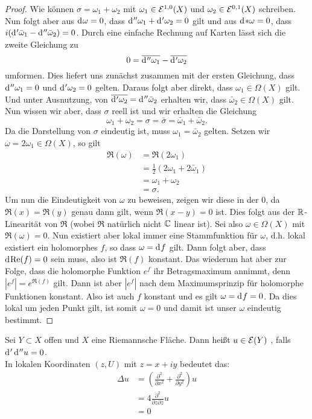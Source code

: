 \begin{proof}
  Wie können $\sigma = \omega_1 + \omega_2$ mit $\omega_1 \in
  \mathcal{E}^{1,0}(X)$ und $\omega_2 \in \mathcal{E}^{0,1}(X)$ schreiben. Nun
  folgt aber aus $\d[\omega] = 0$, dass $\d[''\omega_1] +
  \d['\omega_2] = 0$ gilt und aus $\d[\ast \omega] = 0$, dass
  $i(\d['\bar \omega_1] - \d[''\bar \omega_2]) = 0$. Durch eine einfache
  Rechnung auf Karten lässt sich die zweite Gleichung zu
  \[
  0 = \overline{\d[''\omega_1]} - \overline{\d['\omega_2]}
  \]
  umformen. Dies liefert uns zunächst zusammen mit der ersten
  Gleichung, dass $\d[''\omega_1] = 0$ und $\d['\omega_2] = 0$
  gelten. Daraus folgt aber direkt, dass $\omega_1 \in \Omega(X)$
  gilt. Und unter Ausnutzung, von $\overline{\d['\omega_2]} = \d[''
  \bar \omega_2]$ erhalten wir, dass $\bar \omega_2 \in \Omega(X)$
  gilt. Nun wissen wir aber, dass $\sigma$ reell ist und wir erhalten
  die Gleichung
  \[
  \omega_1 + \omega_2 = \sigma = \bar \sigma = \bar \omega_1 + \bar
  \omega_2.
  \]
  Da die Darstellung von $\sigma$ eindeutig ist, muss $\omega_1 =
  \bar \omega_2$ gelten. Setzen wir $\omega = 2\omega_1 \in
  \Omega(X)$, so gilt
  \begin{align*}
    \Re(\omega) & = \Re(2\omega_1) \\
    & = \frac{1}{2}( 2 \omega_1 + 2 \bar \omega_1) \\
    & = \omega_1 + \omega_2 \\
    & = \sigma.
  \end{align*}
  Um nun die Eindeutigkeit von $\omega$ zu beweisen, zeigen wir diese
  in der $0$, da $\Re(x) = \Re(y)$ genau dann gilt, wenn $\Re(x-y) =
  0$ ist. Dies folgt aus der $\mathbb{R}$-Linearität von $\Re$ (wobei $\Re$
  natürlich nicht $\mathbb{C}$ linear ist). Sei also $\omega \in \Omega(X)$
  mit $\Re(\omega) = 0$. Nun existiert aber lokal immer eine
  Stammfunktion für $\omega$, d.h. lokal existiert ein holomorphes
  $f$, so dass $\omega = \d[f]$ gilt. Dann folgt aber, dass
  $\d[\Re(f)] = 0$ sein muss, also ist $\Re(f)$ konstant. Das wiederum
  hat aber zur Folge, dass die holomorphe Funktion $e^f$ ihr
  Betragsmaximum annimmt, denn $|e^f| = e^{\Re(f)}$ gilt. Dann ist
  aber $|e^f|$ nach dem Maximumsprinzip für holomorphe Funktionen
  konstant. Also ist auch $f$ konstant und es gilt $\omega = \d[f] =
  0$. Da dies lokal um jeden Punkt gilt, ist somit $\omega = 0$ und
  damit ist unser $\omega$ eindeutig bestimmt.
\end{proof}

\begin{defin}
  Sei $Y \subset X$ offen und $X$ eine Riemannsche Fläche. Dann heißt
  $u \in \mathcal{E}(Y)$ , falls $\d['\d[''u]] = 0$. \\
  In lokalen Koordinaten $(z,U)$ mit $z = x + iy$ bedeutet das:
  \begin{align*}
    \Delta u & = \left ( \frac{\partial^2}{\partial x^2} +
      \frac{\partial^2}{\partial y^2} \right ) u \\
    & = 4 \frac{\partial^2}{\partial z \partial \bar z} u \\
    & = 0
  \end{align*}
\end{defin}

